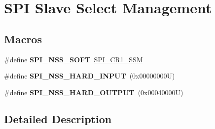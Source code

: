 \hypertarget{group___s_p_i___slave___select__management}{}\section{S\+PI Slave Select Management}
\label{group___s_p_i___slave___select__management}
\subsection*{Macros}
\begin{DoxyCompactItemize}
\item 
\mbox{\label{group___s_p_i___slave___select__management_ga0bf14691b9d03eb158f190cefa7ab8fc}} 
\#define {\bfseries S\+P\+I\+\_\+\+N\+S\+S\+\_\+\+S\+O\+FT}~\hyperlink{group___peripheral___registers___bits___definition_ga0e236047e05106cf1ba7929766311382}{S\+P\+I\+\_\+\+C\+R1\+\_\+\+S\+SM}
\item 
\mbox{\label{group___s_p_i___slave___select__management_ga62c42a5e28ce3b0dc92c5186c10accf8}} 
\#define {\bfseries S\+P\+I\+\_\+\+N\+S\+S\+\_\+\+H\+A\+R\+D\+\_\+\+I\+N\+P\+UT}~(0x00000000\+U)
\item 
\mbox{\label{group___s_p_i___slave___select__management_gab7f2da432661406a37fa2afe4efacd87}} 
\#define {\bfseries S\+P\+I\+\_\+\+N\+S\+S\+\_\+\+H\+A\+R\+D\+\_\+\+O\+U\+T\+P\+UT}~(0x00040000\+U)
\end{DoxyCompactItemize}


\subsection{Detailed Description}
